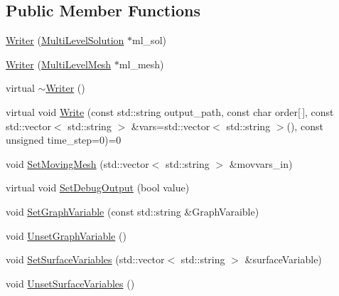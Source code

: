 \subsection*{Public Member Functions}
\begin{DoxyCompactItemize}
\item 
\mbox{\hyperlink{classfemus_1_1_writer_aab7c838f3993d52a347bdf35a76c2085}{Writer}} (\mbox{\hyperlink{classfemus_1_1_multi_level_solution}{Multi\+Level\+Solution}} $\ast$ml\+\_\+sol)
\item 
\mbox{\hyperlink{classfemus_1_1_writer_ad6429c1b9ee2ecc9b684596fce5e05ca}{Writer}} (\mbox{\hyperlink{classfemus_1_1_multi_level_mesh}{Multi\+Level\+Mesh}} $\ast$ml\+\_\+mesh)
\item 
virtual \mbox{\hyperlink{classfemus_1_1_writer_a16d2662b9dcdd7a9553578e03ab2a26f}{$\sim$\+Writer}} ()
\item 
virtual void \mbox{\hyperlink{classfemus_1_1_writer_aa0f7400e0546946f317cc361397d97bd}{Write}} (const std\+::string output\+\_\+path, const char order\mbox{[}$\,$\mbox{]}, const std\+::vector$<$ std\+::string $>$ \&vars=std\+::vector$<$ std\+::string $>$(), const unsigned time\+\_\+step=0)=0
\item 
void \mbox{\hyperlink{classfemus_1_1_writer_ac484a2d3a8969473e4c8569da644e111}{Set\+Moving\+Mesh}} (std\+::vector$<$ std\+::string $>$ \&movvars\+\_\+in)
\item 
virtual void \mbox{\hyperlink{classfemus_1_1_writer_a17a6789b58e05989d74698904346f699}{Set\+Debug\+Output}} (bool value)
\item 
void \mbox{\hyperlink{classfemus_1_1_writer_adc8bd9b254a8766a5073624c75b0f649}{Set\+Graph\+Variable}} (const std\+::string \&Graph\+Varaible)
\item 
void \mbox{\hyperlink{classfemus_1_1_writer_a066d61d2539069edbb156f42b5b69222}{Unset\+Graph\+Variable}} ()
\item 
void \mbox{\hyperlink{classfemus_1_1_writer_a4af0281b254bd3da0e5ea79008bfd9b4}{Set\+Surface\+Variables}} (std\+::vector$<$ std\+::string $>$ \&surface\+Variable)
\item 
void \mbox{\hyperlink{classfemus_1_1_writer_aee6d76214fc7c1766e0394a638563869}{Unset\+Surface\+Variables}} ()
\end{DoxyCompactItemize}

